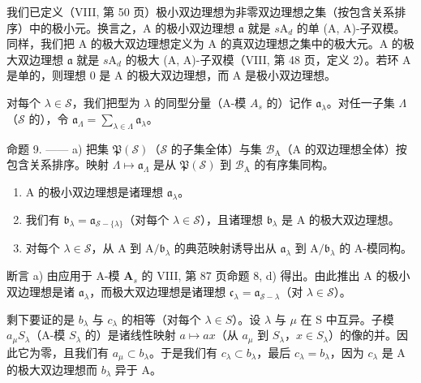 我们已定义（VIII, 第 50 页）极小双边理想为非零双边理想之集（按包含关系排序）中的极小元。换言之，A 的极小双边理想 \(\mathfrak{a}\) 就是 \(s\mathrm{A}_d\) 的单 (A, A)-子双模。同样，我们把 A 的极大双边理想定义为 A 的真双边理想之集中的极大元。A 的极大双边理想 \(\mathfrak{a}\) 就是 \(s\mathrm{A}_d\) 的极大 (A, A)-子双模（VIII, 第 48 页，定义 2）。若环 A 是单的，则理想 0 是 A 的极大双边理想，而 A 是极小双边理想。

对每个 \(\lambda \in \mathcal{S}\)，我们把型为 \(\lambda\) 的同型分量（A-模 \(A_s\) 的）记作 \(\mathfrak{a}_{\lambda}\)。对任一子集 \(\Lambda\)（\(\mathcal{S}\) 的），令 \(\mathfrak{a}_{\Lambda} = \sum_{\lambda \in \Lambda} \mathfrak{a}_{\lambda}\)。

命题 9. —— a) 把集 \(\mathfrak{P}(\mathcal{S})\)（\(\mathcal{S}\) 的子集全体）与集 \(\mathcal{B}_{\mathrm{A}}\)（A 的双边理想全体）按包含关系排序。映射 \(\Lambda \mapsto \mathfrak{a}_{\Lambda}\) 是从 \(\mathfrak{P}(\mathcal{S})\) 到 \(\mathcal{B}_{\mathrm{A}}\) 的有序集同构。

\begin{enumerate}
\def\labelenumi{\alph{enumi})}
\setcounter{enumi}{1}
\item
  A 的极小双边理想是诸理想 \(\mathfrak{a}_{\lambda}\)。
\item
  我们有 \(\mathfrak{b}_{\lambda} = \mathfrak{a}_{\mathcal{S} - \{\lambda\}}\)（对每个 \(\lambda \in \mathcal{S}\)），且诸理想 \(\mathfrak{b}_{\lambda}\) 是 A 的极大双边理想。
\item
  对每个 \(\lambda \in \mathcal{S}\)，从 A 到 \(\mathrm{A} / \mathfrak{b}_{\lambda}\) 的典范映射诱导出从 \(\mathfrak{a}_{\lambda}\) 到 \(\mathrm{A} / \mathfrak{b}_{\lambda}\) 的 A-模同构。
\end{enumerate}

断言 a) 由应用于 A-模 \(\mathbf{A}_s\) 的 VIII, 第 87 页命题 8, d) 得出。由此推出 A 的极小双边理想是诸 \(\mathfrak{a}_{\lambda}\)，而极大双边理想是诸理想 \(\mathfrak{c}_{\lambda} = \mathfrak{a}_{\mathcal{S} - \lambda}\)（对 \(\lambda \in \mathcal{S}\)）。

剩下要证的是 \(b_{\lambda}\) 与 \(c_{\lambda}\) 的相等（对每个 \(\lambda \in S\)）。设 \(\lambda\) 与 \(\mu\) 在 S 中互异。子模 \(a_{\mu}S_{\lambda}\)（A-模 \(S_{\lambda}\) 的）是诸线性映射 \(a \mapsto ax\)（从 \(a_{\mu}\) 到 \(S_{\lambda}\)，\(x \in S_{\lambda}\)）的像的并。因此它为零，且我们有 \(a_{\mu} \subset b_{\lambda}\)。于是我们有 \(c_{\lambda} \subset b_{\lambda}\)，最后 \(c_{\lambda} = b_{\lambda}\)，因为 \(c_{\lambda}\) 是 A 的极大双边理想而 \(b_{\lambda}\) 异于 A。

